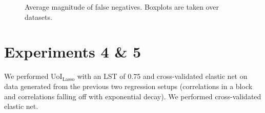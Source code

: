 \documentclass[11pt]{article}
\begin{document}
\begin{figure}[H]
	\centering
	\caption{Average magnitude of false negatives. Boxplots are taken over datasets.}
	\label{fig:exp3-sel-acc}
\end{figure}

\newpage

\section{Experiments 4 \& 5}
We performed UoI$_{\text{Lasso}}$ with an LST of 0.75 and cross-validated elastic net on data generated from the previous two regression setups (correlations in a block and correlations falling off with exponential decay). We performed cross-validated elastic net.
\end{document}
